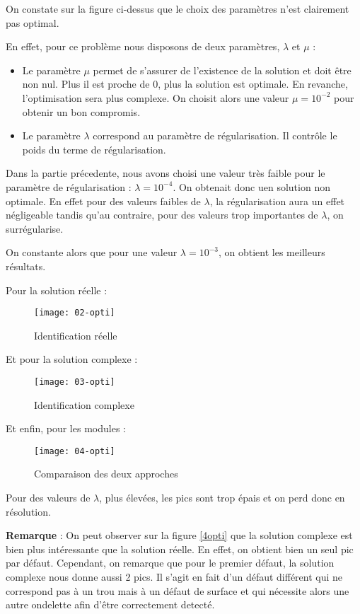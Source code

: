 \documentclass[12pt,a4paper,titlepage]{scrartcl}
\begin{document}
On constate sur la figure ci-dessus que le choix des paramètres n'est
clairement pas optimal.

En effet, pour ce problème nous disposons de deux paramètres, $\lambda$
et $\mu$ :

\begin{itemize}
    \item{Le paramètre $\mu$ permet de s'assurer de l'existence de la solution et
        doit être non nul. Plus il est proche de 0, plus la solution
        est optimale. En revanche, l'optimisation sera plus complexe. On
        choisit alors une valeur $\mu = 10^{-2}$ pour obtenir un bon
        compromis.}
    \item{Le paramètre $\lambda$ correspond au paramètre de régularisation.
        Il contrôle le poids du terme de régularisation.}
\end{itemize}

Dans la partie précedente, nous avons choisi une valeur très faible pour
le paramètre de régularisation : $\lambda = 10^{-4}$. On obtenait donc
uen solution non optimale. En effet pour des valeurs faibles de $\lambda$,
la régularisation aura un effet négligeable tandis qu'au contraire,
pour des valeurs trop importantes de $\lambda$, on surrégularise.

On constante alors que pour une valeur $\lambda = 10^{-3}$, on obtient
les meilleurs résultats.

Pour la solution réelle :

\begin{figure}[H]
    \caption{Identification réelle}
    \texttt{[image: 02-opti]}
    \centering
\end{figure}

Et pour la solution complexe :

\begin{figure}[H]
    \caption{Identification complexe}
    \texttt{[image: 03-opti]}
    \centering
\end{figure}

Et enfin, pour les modules :

\begin{figure}[H]
    \caption{Comparaison des deux approches}
    \label{fig:4opti}
    \texttt{[image: 04-opti]}
    \centering
\end{figure}

Pour des valeurs de $\lambda$, plus élevées, les pics sont trop épais
et on perd donc en résolution.

\textbf{Remarque} : On peut observer sur la figure \ref{4opti} que la solution complexe
est bien plus intéressante que la solution réelle. En effet, on obtient
bien un seul pic par défaut. Cependant, on remarque que pour le premier
défaut, la solution complexe nous donne aussi 2 pics. Il s'agit en fait d'un défaut
différent qui ne correspond pas à un trou mais à un défaut de surface et qui
nécessite alors une autre ondelette afin d'être correctement detecté.
\end{document}
